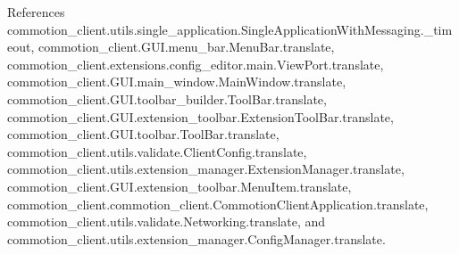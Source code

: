 References commotion\-\_\-client.\-utils.\-single\-\_\-application.\-Single\-Application\-With\-Messaging.\-\_\-timeout, commotion\-\_\-client.\-G\-U\-I.\-menu\-\_\-bar.\-Menu\-Bar.\-translate, commotion\-\_\-client.\-extensions.\-config\-\_\-editor.\-main.\-View\-Port.\-translate, commotion\-\_\-client.\-G\-U\-I.\-main\-\_\-window.\-Main\-Window.\-translate, commotion\-\_\-client.\-G\-U\-I.\-toolbar\-\_\-builder.\-Tool\-Bar.\-translate, commotion\-\_\-client.\-G\-U\-I.\-extension\-\_\-toolbar.\-Extension\-Tool\-Bar.\-translate, commotion\-\_\-client.\-G\-U\-I.\-toolbar.\-Tool\-Bar.\-translate, commotion\-\_\-client.\-utils.\-validate.\-Client\-Config.\-translate, commotion\-\_\-client.\-utils.\-extension\-\_\-manager.\-Extension\-Manager.\-translate, commotion\-\_\-client.\-G\-U\-I.\-extension\-\_\-toolbar.\-Menu\-Item.\-translate, commotion\-\_\-client.\-commotion\-\_\-client.\-Commotion\-Client\-Application.\-translate, commotion\-\_\-client.\-utils.\-validate.\-Networking.\-translate, and commotion\-\_\-client.\-utils.\-extension\-\_\-manager.\-Config\-Manager.\-translate.


